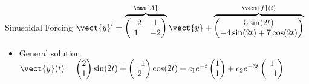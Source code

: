 \begin{frame}{Sinusoidal Forcing \qquad $\vect{y}'=\overbrace{\begin{pmatrix}-2&1\\1&-2\end{pmatrix}}^{\mat{A}}\vect{y}+\overbrace{\begin{pmatrix}5\sin(2t)\\-4\sin(2t)+7\cos(2t)\end{pmatrix}}^{\vect{f}(t)}$}
\begin{itemize}
\[  \]
  \[
    \left[\begin{array}{rr|rr|r}
      {\color{red}-2}&{\color{red}1}&{\color{red}2}&{\color{red}0}&{\color{red}-5}\\
      {\color{red}1}&{\color{red}-2}&{\color{red}0}&{\color{red}2}&{\color{red}4}\\\hline
      {\color{blue}2}&{\color{blue}0}&{\color{blue}2}&{\color{blue}-1}&{\color{blue}0}\\
      {\color{blue}0}&{\color{blue}2}&{\color{blue}-1}&{\color{blue}2}&{\color{blue}7}
    \end{array}\right]
    \sim\left[\begin{array}{rrrr|r}
      1&0&0&0&2\\0&1&0&0&1\\0&0&1&0&-1\\0&0&0&1&2
    \end{array}\right]
    \quad\Longrightarrow\quad
    \vect{a}=\begin{pmatrix}2\\1\end{pmatrix}
    \qquad \vect{b}=\begin{pmatrix}-1\\2\end{pmatrix}
  \]
  \item General solution
  $\vect{y}(t)=\begin{pmatrix}2\\1\end{pmatrix}\sin(2t)
  +\begin{pmatrix}-1\\2\end{pmatrix}\cos(2t)
  +c_1e^{-t}\begin{pmatrix}1\\1\end{pmatrix}
  +c_2e^{-3t}\begin{pmatrix}1\\-1\end{pmatrix}$
\end{itemize}
\end{frame}
